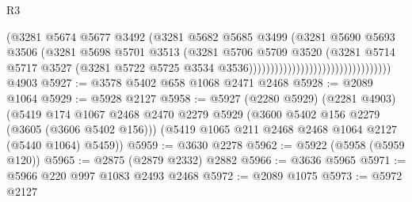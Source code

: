 \begin{lexlean}{R3}
\begin{coremodule}
                                                        (@3281
                                                          @5674
                                                          @5677
                                                          @3492
                                                          (@3281
                                                            @5682
                                                            @5685
                                                            @3499
                                                            (@3281
                                                              @5690
                                                              @5693
                                                              @3506
                                                              (@3281
                                                                @5698
                                                                @5701
                                                                @3513
                                                                (@3281
                                                                  @5706
                                                                  @5709
                                                                  @3520
                                                                  (@3281
                                                                    @5714
                                                                    @5717
                                                                    @3527
                                                                    (@3281
                                                                      @5722
                                                                      @5725
                                                                      @3534
                                                                      @3536)))))))))))))))))))))))))))))))))
    @4903
@5927 := @3578 @5402 @658 @1068 @2471 @2468
@5928 := @2089 @1064
@5929 := @5928 @2127
@5958 := @5927
    (@2280 @5929)
    (@2281 @4903)
    (@5419
      @174
      @1067
      @2468
      @2470
      @2279
      @5929
      (@3600 @5402 @156 @2279 (@3605 (@3606 @5402 @156)))
      (@5419 @1065 @211 @2468 @2468 @1064 @2127 (@5440 @1064) @5459))
@5959 := @3630 @2278
@5962 := @5922 (@5958 (@5959 @120))
@5965 := @2875 (@2879 @2332) @2882
@5966 := @3636 @5965
@5971 := @5966 @220 @997 @1083 @2493 @2468
@5972 := @2089 @1075
@5973 := @5972 @2127

\end{coremodule}
\end{lexlean}
